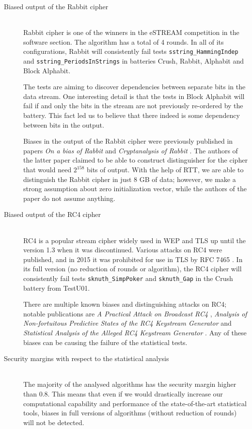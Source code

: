 \documentclass[
	digital,    %
	oneside,
	color,
	11pt,
	nocover,
	notable,
	nolof,
	nolot,
]{fithesis3}
\theoremstyle{definition}
\theoremstyle{remark}
\begin{document}
\begin{description}
\item[Biased output of the Rabbit cipher] \hfill \\
Rabbit \cite{rabbit} cipher is one of the winners in the eSTREAM competition in the software section. The algorithm has a total of 4 rounds. In all of its configurations, Rabbit will consistently fail tests \texttt{sstring\_HammingIndep} and \texttt{sstring\_PeriodsInStrings} in batteries Crush, Rabbit, Alphabit and Block Alphabit. 

The tests are aiming to discover dependencies between separate bits in the data stream. One interesting detail is that the tests in Block Alphabit will fail if and only the bits in the stream are not previously re-ordered by the battery. This fact led us to believe that there indeed is some dependency between bits in the output.

Biases in the output of the Rabbit cipher were previously published in papers \textit{On a bias of Rabbit} \cite{rabbit-bias-1} and \textit{Cryptanalysis of Rabbit} \cite{rabbit-bias-2}. The authors of the latter paper claimed to be able to construct distinguisher for the cipher that would need $2^{158}$ bits of output. With the help of RTT, we are able to distinguish the Rabbit cipher in just 8 GB of data; however, we make a strong assumption about zero initialization vector, while the authors of the paper do not assume anything.

\item[Biased output of the RC4 cipher] \hfill \\
RC4 \cite{rc4} is a popular stream cipher widely used in WEP and TLS up until the version 1.3 when it was discontinued. Various attacks on RC4 were published, and in 2015 it was prohibited for use in TLS by RFC 7465 \cite{rfc7465}. In its full version (no reduction of rounds or algorithm), the RC4 cipher will consistently fail tests \texttt{sknuth\_SimpPoker} and \texttt{sknuth\_Gap} in the Crush battery from TestU01.

There are multiple known biases and distinguishing attacks on RC4; notable publications are \textit{A Practical Attack on Broadcast RC4} \cite{rc4-bias-1}, \textit{Analysis of Non-fortuitous Predictive States of the RC4 Keystream Generator} \cite{rc4-bias-2} and \textit{Statistical Analysis of the Alleged RC4 Keystream Generator} \cite{rc4-bias-3}. Any of these biases can be causing the failure of the statistical tests.

\item[Security margins with respect to the statistical analysis] \hfill \\
The majority of the analysed algorithms has the security margin higher than 0.8. This means that even if we would drastically increase our computational capability and performance of the state-of-the-art statistical tools, biases in full versions of algorithms (without reduction of rounds) will not be detected.


\end{description}
\end{document}
